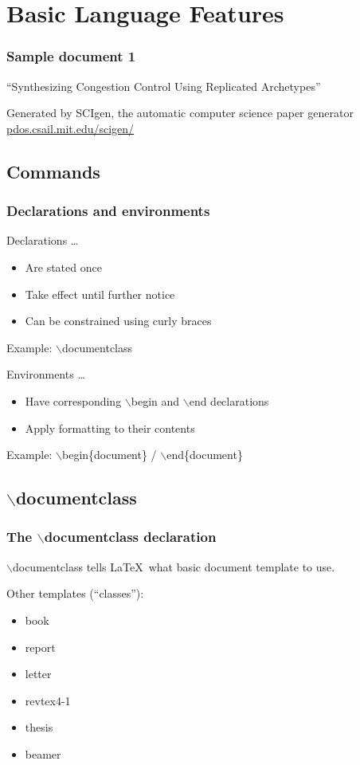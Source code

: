 \documentclass[ignorenonframetext]{beamer}
\begin{document}
\section{Basic Language Features}
\begin{frame}
  \frametitle{Sample document 1}
  ``Synthesizing Congestion Control Using Replicated Archetypes''

  Generated by SCIgen, the automatic computer science paper generator\\
  \url{pdos.csail.mit.edu/scigen/}
\end{frame}

\subsection{Commands}
\begin{frame}
  \frametitle{Declarations and environments}
  \begin{block}{Declarations \ldots}
    \begin{itemize}
    \item Are stated once
    \item Take effect until further notice
    \item Can be constrained using curly braces
    \end{itemize}
    Example: $\backslash$documentclass
  \end{block}
  \begin{block}{Environments \ldots}
    \begin{itemize}
    \item Have corresponding $\backslash$begin and $\backslash$end declarations
    \item Apply formatting to their contents
    \end{itemize}
    Example: $\backslash$begin\{document\} / $\backslash$end\{document\}
  \end{block}
\end{frame}

\subsection{$\backslash$documentclass}
\begin{frame}
  \frametitle{The $\backslash$documentclass declaration}
  $\backslash$documentclass tells \LaTeX\ what basic document template
  to use.
  \begin{block}{Other templates (``classes''):}
    \begin{itemize}
    \item book
    \item report
    \item letter
    \item revtex4-1
    \item thesis
    \item beamer
    \end{itemize}
  \end{block}
\end{frame}
\end{document}
